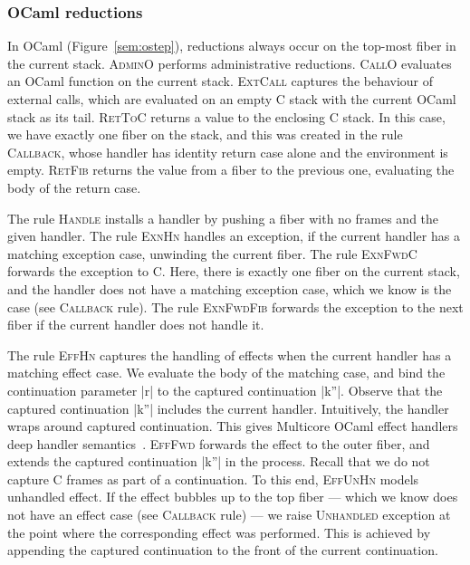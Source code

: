 \documentclass[sigplan,10pt,review,anonymous]{acmart}\settopmatter{printfolios=true,printccs=false,printacmref=false}
\begin{document}
\vspace{-1mm}
\subsubsection{OCaml reductions}

In OCaml (Figure~\ref{sem:ostep}), reductions always occur on the top-most
fiber in the current stack. \textsc{AdminO} performs administrative reductions.
\textsc{CallO} evaluates an OCaml function on the current stack.
\textsc{ExtCall} captures the behaviour of external calls, which are evaluated
on an empty C stack with the current OCaml stack as its tail. \textsc{RetToC}
returns a value to the enclosing C stack. In this case, we have exactly one
fiber on the stack, and this was created in the rule \textsc{Callback}, whose
handler has identity return case alone and the environment is empty.
\textsc{RetFib} returns the value from a fiber to the previous one, evaluating the
body of the return case.

The rule \textsc{Handle} installs a handler by pushing a fiber with no frames
and the given handler. The rule \textsc{ExnHn} handles an exception, if the
current handler has a matching exception case, unwinding the current fiber. The
rule \textsc{ExnFwdC} forwards the exception to C. Here, there is exactly one
fiber on the current stack, and the handler does not have a matching exception
case, which we know is the case (see \textsc{Callback} rule). The rule
\textsc{ExnFwdFib} forwards the exception to the next fiber if the current
handler does not handle it.

The rule \textsc{EffHn} captures the handling of effects when the current
handler has a matching effect case. We evaluate the body of the matching case,
and bind the continuation parameter |r| to the captured continuation |k''|.
Observe that the captured continuation |k''| includes the current handler.
Intuitively, the handler wraps around captured continuation. This gives
Multicore OCaml effect handlers deep handler semantics~\cite{Hillerstrom20}.
\textsc{EffFwd} forwards the effect to the outer fiber, and extends the
captured continuation |k''| in the process. Recall that we do not capture C
frames as part of a continuation. To this end, \textsc{EffUnHn} models
unhandled effect. If the effect bubbles up to the top fiber --- which we know does
not have an effect case (see \textsc{Callback} rule) --- we raise
\textsc{Unhandled} exception at the point where the corresponding effect was
performed. This is achieved by appending the captured continuation to the front
of the current continuation.
\end{document}
